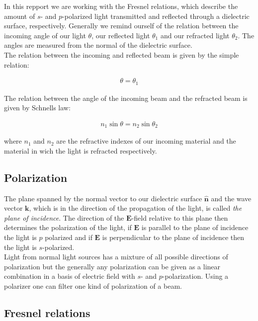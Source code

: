 In this repport we are working with the Fresnel relations, which describe the amount of $s$- and $p$-polarized light transmitted and reflected through a dielectric surface, respectively. Generally we remind ourself of the relation between the incoming angle of our light $\theta$, our reflected light $\theta_1$ and our refracted light $\theta_2$. The angles are measured from the normal of the dielectric surface.\\

The relation between the incoming and reflected beam is given by the simple relation:

\begin{align}
\theta=\theta_1
\end{align}

The relation between the angle of the incoming beam and the refracted beam is given by Schnells law:

\begin{align}
n_1\sin{\theta}=n_2\sin{\theta_2}
\end{align}

where $n_1$ and $n_2$ are the refractive indexes of our incoming material and the material in wich the light is refracted respectively. 

\subsection{Polarization}

The plane spanned by the normal vector to our dielectric surface $\hat{\textbf{n}}$ and the wave vector $\textbf{k}$, which is in the direction of the propagation of the light, is called \textit{the plane of incidence}. The direction of the $\textbf{E}$-field relative to this plane then determines the polarization of the light, if $\textbf{E}$ is parallel to the plane of incidence the light is $p$ polarized and if $\textbf{E}$ is perpendicular to the plane of incidence then the light is $s$-polarized. \\


Light from normal light sources has a mixture of all possible directions of polarization but the generally any polarization can be given as a linear combination in a basis of electric field with $s$- and $p$-polarization. Using a polarizer one can filter one kind of polarization of a beam.


\subsection{Fresnel relations}


